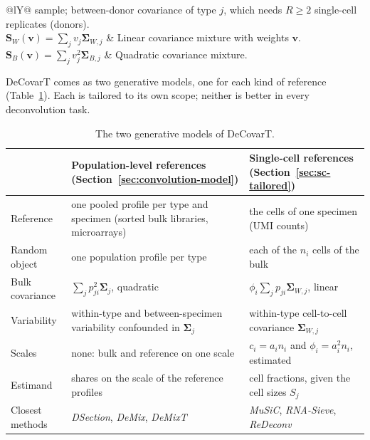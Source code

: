\documentclass[pdflatex, sn-nature]{sn-jnl}
\theoremstyle{thmstyleone}%
\theoremstyle{thmstyletwo}%
\theoremstyle{thmstylethree}%
\begin{document}
\begin{table}[ht]
\begin{tabularx}{\textwidth}{@{}lY@{}}
      sample; between-donor covariance of type \(j\), which needs \(R\ge2\) single-cell replicates
      (donors). \\
    \(\boldsymbol{S}_{W}(\boldsymbol{v})=\sum_{j}v_{j}\boldsymbol{\Sigma}_{W,j}\) &
      Linear covariance mixture with weights \(\boldsymbol{v}\). \\
    \(\boldsymbol{S}_{B}(\boldsymbol{v})=\sum_{j}v_{j}^{2}\boldsymbol{\Sigma}_{B,j}\) &
      Quadratic covariance mixture. \\
    \bottomrule
  \end{tabularx}
\end{table}

DeCovarT comes as two generative models, one for each kind of reference (Table~\ref{tab:two-models}).
Each is tailored to its own scope; neither is better in every deconvolution task.

\begin{table}[ht]
  \centering
  \small
  \caption{The two generative models of DeCovarT.}
  \label{tab:two-models}
  \begin{tabular}{@{}>{\raggedright\arraybackslash}p{}>{\raggedright\arraybackslash}p{}>{\raggedright\arraybackslash}p{}@{}}
    \toprule
    & Population-level references (Section~\ref{sec:convolution-model}) & Single-cell references
      (Section~\ref{sec:sc-tailored}) \\
    \midrule
    Reference & one pooled profile per type and specimen (sorted bulk libraries, microarrays) &
      the cells of one specimen (UMI counts) \\
    Random object & one population profile per type & each of the \(n_{i}\) cells of the bulk \\
    Bulk covariance & \(\sum_{j}p_{ji}^{2}\boldsymbol{\Sigma}_{j}\), quadratic & \(\phi_{i}\sum_{j}p_{ji}\boldsymbol{\Sigma}_{W,j}\), linear \\
    Variability & within-type and between-specimen variability confounded in \(\boldsymbol{\Sigma}_{j}\) &
      within-type cell-to-cell covariance \(\boldsymbol{\Sigma}_{W,j}\) \\
    Scales & none: bulk and reference on one scale & \(c_{i}=a_{i}n_{i}\) and \(\phi_{i}=a_{i}^{2}n_{i}\), estimated \\
    Estimand & shares on the scale of the reference profiles & cell fractions, given the cell sizes \(S_{j}\) \\
    Closest methods & \emph{DSection}, \emph{DeMix}, \emph{DeMixT} & \emph{MuSiC}, \emph{RNA-Sieve}, \emph{ReDeconv} \\
    \bottomrule
  \end{tabular}
\end{table}
\end{document}
